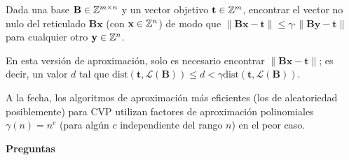 \begin{frame}
\begin{definition}
Dada una base $\mathbf{B}\in \mathbb{Z}^{m\times n}$ y un vector objetivo $\mathbf{t} \in \mathbb{Z}^m$, encontrar el vector no nulo del reticulado $\mathbf{Bx}$ (con $\mathbf{x}\in \mathbb{Z}^n$) de modo que $\|\mathbf{Bx}-\mathbf{t}\| \leq \gamma \cdot \|\mathbf{By}-\mathbf{t}\|$ para cualquier otro $\mathbf{y} \in \mathbb{Z}^n$.
\end{definition}

En esta versión de aproximación, solo es necesario encontrar $\|\mathbf{Bx}-\mathbf{t}\|$; es decir, un valor $d$ tal que $\text{dist}(\mathbf{t},\mathcal{L}(\mathbf{B})) \leq d < \gamma \text{dist}(\mathbf{t},\mathcal{L}(\mathbf{B}))$.

A la fecha, los algoritmos de aproximación más eficientes (los de aleatoriedad posiblemente) para CVP utilizan factores de aproximación polinomiales $\gamma(n) = n^c$ (para algún $c$ independiente del rango $n$) en el peor caso.
\end{frame}

\begin{frame}
    \begin{center}
        {\huge \bf Preguntas}
    \end{center}
\end{frame}


